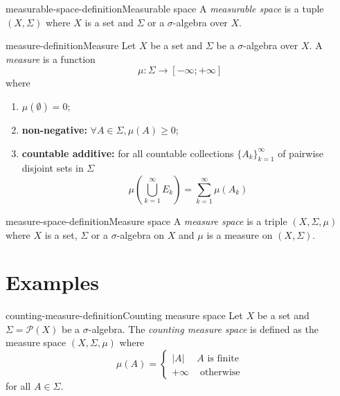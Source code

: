 \documentclass[preview]{standalone}
\begin{document}
\genpage

\begin{snippetdefinition}{measurable-space-definition}{Measurable space}
    A \textit{measurable space} is a tuple \((X, \Sigma)\)
    where \(X\) is a set and \(\Sigma\) or a \(\sigma\)-algebra over \(X\).
\end{snippetdefinition}

\begin{snippetdefinition}{measure-definition}{Measure}
    Let \(X\) be a set and \(\Sigma\) be a \(\sigma\)-algebra over \(X\).
    A \textit{measure} is a function
    \[
        \mu\colon \Sigma \to [-\infty; + \infty]
    \]
    where
    \begin{enumerate}
        \item \(\mu(\emptyset) = 0\);
        \item \textbf{non-negative:} \(\forall A \in \Sigma, \mu(A) \geq 0\);
        \item \textbf{countable additive:} for all countable collections \({\{A_k\}}_{k=1}^\infty\)
        of pairwise disjoint sets in \(\Sigma\)
        \[
            \mu\left( \bigcup_{k=1}^\infty E_k \right)
            =
            \sum_{k=1}^\infty \mu(A_k)
        \]
    \end{enumerate}
\end{snippetdefinition}

\begin{snippetdefinition}{measure-space-definition}{Measure space}
    A \textit{measure space} is a triple \((X, \Sigma, \mu)\)
    where \(X\) is a set, \(\Sigma\) or a \(\sigma\)-algebra on \(X\)
    and \(\mu\) is a measure on \((X, \Sigma)\).
\end{snippetdefinition}

\section{Examples}

\begin{snippetdefinition}{counting-measure-definition}{Counting measure space}
    Let \(X\) be a set and \(\Sigma = \mathcal{P}(X)\) be a \(\sigma\)-algebra.
    The \textit{counting measure space}
    is defined as the measure space \((X, \Sigma, \mu)\)
    where
    \[
        \mu(A) = \begin{cases}
            |A| & A \text{ is finite} \\
            +\infty & \text{ otherwise}
        \end{cases}
    \]
    for all \(A \in \Sigma\).
\end{snippetdefinition}

\end{document}
